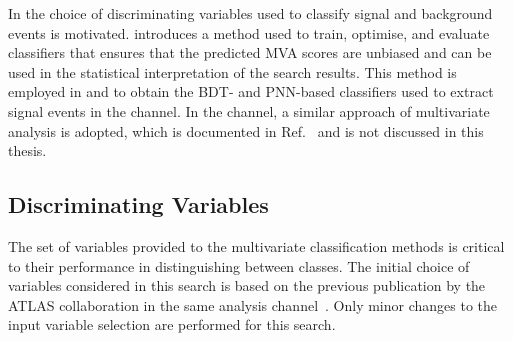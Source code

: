 In  the choice of discriminating
variables used to classify signal and background events is
motivated.  introduces a method used to train,
optimise, and evaluate classifiers that ensures that the predicted MVA scores
are unbiased and can be used in the statistical interpretation of the search
results. This method is employed in  and 
to obtain the BDT- and PNN-based classifiers used to extract signal events in
the \hadhad channel. In the \lephad channel, a similar approach of multivariate
analysis is adopted, which is documented in Ref.~\cite{HDBS-2018-40} and is not
discussed in this thesis.


\subsection{Discriminating Variables}%
\label{sec:mva_discriminating variables}

The set of variables provided to the multivariate classification
methods is critical to their performance in distinguishing between
classes. The initial choice of variables considered in this search is
based on the previous publication by the ATLAS collaboration in the
same analysis channel~\cite{HIGG-2016-16-witherratum}. Only minor
changes to the input variable selection are performed for this search.

